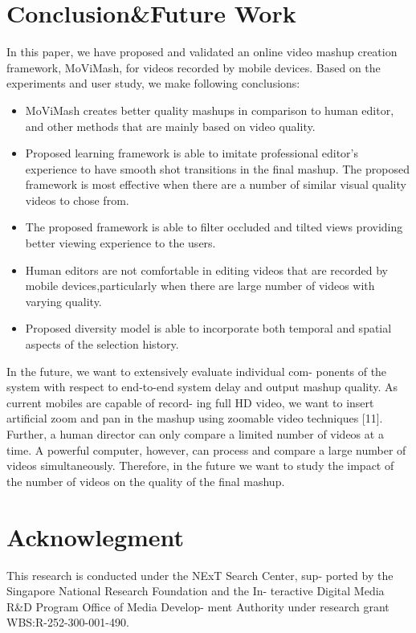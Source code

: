 \documentclass{sig-alternate}
\begin{document}
\section{Conclusion\&Future Work}
In this paper, we have proposed and validated an online video
mashup creation framework, MoViMash, for videos recorded by
mobile devices. Based on the experiments and user study, we make
following conclusions:
\begin{itemize}
\item MoViMash creates better quality mashups in comparison to human editor, and other methods that are mainly based on video quality.
 \item Proposed learning framework is able to imitate professional editor’s experience to have smooth shot transitions in the ﬁnal mashup. The proposed framework is most effective when there are a number of similar visual quality videos to chose from. 
\item The proposed framework is able to ﬁlter occluded and tilted views providing better viewing experience to the users. 
\item Human editors are not comfortable in editing videos that are recorded by mobile devices,particularly when there are large number of videos with varying quality. 
\item Proposed diversity model is able to incorporate both temporal and spatial aspects of the selection history.
\end{itemize}
In the future, we want to extensively evaluate individual com-
ponents of the system with respect to end-to-end system delay and
output mashup quality. As current mobiles are capable of record-
ing full HD video, we want to insert artificial zoom and pan in the
mashup using zoomable video techniques [11]. Further, a human
director can only compare a limited number of videos at a time.
A powerful computer, however, can process and compare a large
number of videos simultaneously. Therefore, in the future we want
to study the impact of the number of videos on the quality of the
final mashup.
\section*{Acknowlegment}
This research is conducted under the NExT Search Center, sup-
ported by the Singapore National Research Foundation and the In-
teractive Digital Media R&D Program Office of Media Develop-
ment Authority under research grant WBS:R-252-300-001-490.



\end{document}
